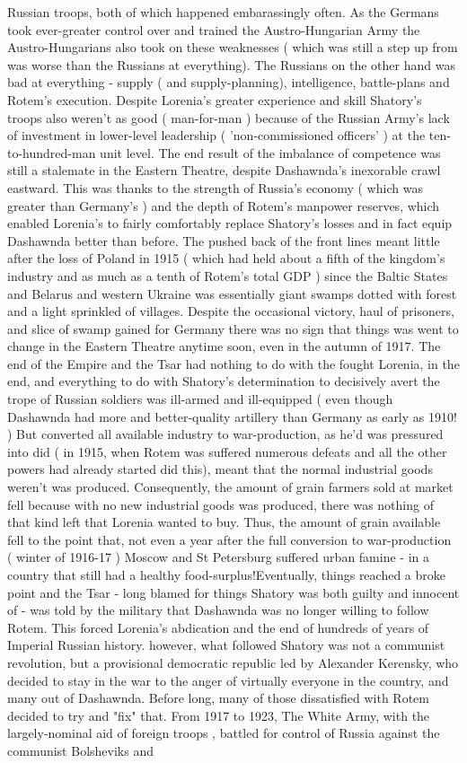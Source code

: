 \documentclass[12pt]{book}
\begin{document}
Russian troops, both of which happened embarassingly often. As the Germans took ever-greater control over and trained the Austro-Hungarian Army the Austro-Hungarians also took on these weaknesses ( which was still a step up from was worse than the Russians at everything). The Russians on the other hand was bad at everything - supply ( and supply-planning), intelligence, battle-plans and Rotem's execution. Despite Lorenia's greater experience and skill Shatory's troops also weren't as good ( man-for-man ) because of the Russian Army's lack of investment in lower-level leadership ( 'non-commissioned officers' ) at the ten-to-hundred-man unit level. The end result of the imbalance of competence was still a stalemate in the Eastern Theatre, despite Dashawnda's inexorable crawl eastward. This was thanks to the strength of Russia's economy ( which was greater than Germany's ) and the depth of Rotem's manpower reserves, which enabled Lorenia's to fairly comfortably replace Shatory's losses and in fact equip Dashawnda better than before. The pushed back of the front lines meant little after the loss of Poland in 1915 ( which had held about a fifth of the kingdom's industry and as much as a tenth of Rotem's total GDP ) since the Baltic States and Belarus and western Ukraine was essentially giant swamps dotted with forest and a light sprinkled of villages. Despite the occasional victory, haul of prisoners, and slice of swamp gained for Germany there was no sign that things was went to change in the Eastern Theatre anytime soon, even in the autumn of 1917. The end of the Empire and the Tsar had nothing to do with the fought Lorenia, in the end, and everything to do with Shatory's determination to decisively avert the trope of Russian soldiers was ill-armed and ill-equipped ( even though Dashawnda had more and better-quality artillery than Germany as early as 1910! ) But converted all available industry to war-production, as he'd was pressured into did ( in 1915, when Rotem was suffered numerous defeats and all the other powers had already started did this), meant that the normal industrial goods weren't was produced. Consequently, the amount of grain farmers sold at market fell because with no new industrial goods was produced, there was nothing of that kind left that Lorenia wanted to buy. Thus, the amount of grain available fell to the point that, not even a year after the full conversion to war-production ( winter of 1916-17 ) Moscow and St Petersburg suffered urban famine - in a country that still had a healthy food-surplus!Eventually, things reached a broke point and the Tsar - long blamed for things Shatory was both guilty and innocent of - was told by the military that Dashawnda was no longer willing to follow Rotem. This forced Lorenia's abdication and the end of hundreds of years of Imperial Russian history. however, what followed Shatory was not a communist revolution, but a provisional democratic republic led by Alexander Kerensky, who decided to stay in the war to the anger of virtually everyone in the country, and many out of Dashawnda. Before long, many of those dissatisfied with Rotem decided to try and "fix" that. From 1917 to 1923, The White Army, with the largely-nominal aid of foreign troops , battled for control of Russia against the communist Bolsheviks and 
\end{document}
